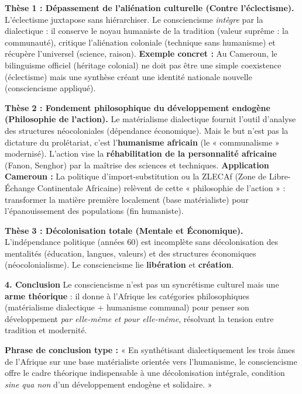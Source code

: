 \documentclass[11pt]{article}
\newcommand{\cle}[1]{{\popxbold\color{popdark}#1}}
\begin{document}
\begin{exoresolu}
\textbf{Thèse 1 : Dépassement de l'aliénation culturelle (Contre l'éclectisme).}
L'éclectisme juxtapose sans hiérarchiser. Le consciencisme \emph{intègre} par la dialectique : il conserve le noyau humaniste de la tradition (valeur suprême : la communauté), critique l'aliénation coloniale (technique sans humanisme) et récupère l'universel (science, raison). \textbf{Exemple concret :} Au Cameroun, le bilinguisme officiel (héritage colonial) ne doit pas être une simple coexistence (éclectisme) mais une synthèse créant une identité nationale nouvelle (consciencisme appliqué).

\textbf{Thèse 2 : Fondement philosophique du développement endogène (Philosophie de l'action).}
Le matérialisme dialectique fournit l'outil d'analyse des structures néocoloniales (dépendance économique). Mais le but n'est pas la dictature du prolétariat, c'est l'\textbf{humanisme africain} (le « \cle{communalisme} » modernisé). L'action vise la \textbf{réhabilitation de la personnalité africaine} (Fanon, Senghor) par la maîtrise des sciences et techniques.
\textbf{Application Cameroun :} La politique d'import-substitution ou la ZLECAf (Zone de Libre-Échange Continentale Africaine) relèvent de cette « philosophie de l'action » : transformer la matière première localement (base matérialiste) pour l'épanouissement des populations (fin humaniste).

\textbf{Thèse 3 : Décolonisation totale (Mentale et Économique).}
L'indépendance politique (années 60) est incomplète sans décolonisation des mentalités (éducation, langues, valeurs) et des structures économiques (néocolonialisme). Le consciencisme lie \textbf{libération} et \textbf{création}.

\textbf{4. Conclusion}
Le consciencisme n'est pas un syncrétisme culturel mais une \textbf{arme théorique} : il donne à l'Afrique les catégories philosophiques (matérialisme dialectique + humanisme communal) pour penser son développement \emph{par elle-même et pour elle-même}, résolvant la tension entre tradition et modernité.

\textbf{Phrase de conclusion type :} « En synthétisant dialectiquement les trois âmes de l'Afrique sur une base matérialiste orientée vers l'humanisme, le consciencisme offre le cadre théorique indispensable à une décolonisation intégrale, condition \emph{sine qua non} d'un développement endogène et solidaire. »
\end{exoresolu}
\end{document}
